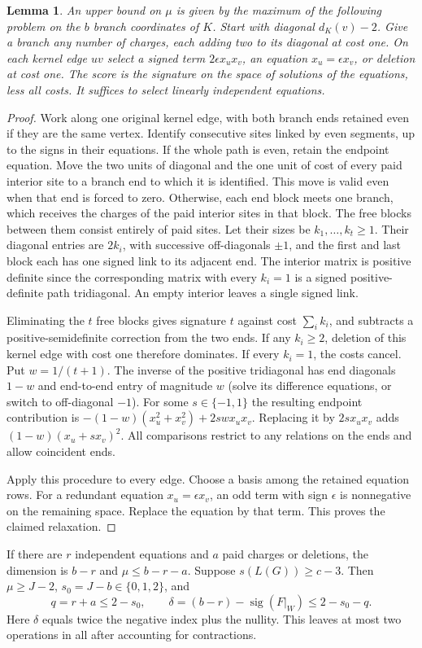 \documentclass[11pt]{article}
\newtheorem{lemma}[theorem]{Lemma}
\newcommand{\sig}{\operatorname{sig}}
\begin{document}
\begin{lemma}\label{lem:relax}
An upper bound on $\mu$ is given by the maximum of the following problem on the $b$ branch coordinates of $K$. Start with diagonal $d_K(v)-2$. Give a branch any number of charges, each adding two to its diagonal at cost one. On each kernel edge $uv$ select a signed term $2\epsilon x_u x_v$, an equation $x_u=\epsilon x_v$, or deletion at cost one. The score is the signature on the space of solutions of the equations, less all costs. It suffices to select linearly independent equations.
\end{lemma}
\begin{proof}
Work along one original kernel edge, with both branch ends retained even if they are the same vertex. Identify consecutive sites linked by even segments, up to the signs in their equations. If the whole path is even, retain the endpoint equation. Move the two units of diagonal and the one unit of cost of every paid interior site to a branch end to which it is identified. This move is valid even when that end is forced to zero. Otherwise, each end block meets one branch, which receives the charges of the paid interior sites in that block. The free blocks between them consist entirely of paid sites. Let their sizes be $k_1,\ldots,k_t\ge1$. Their diagonal entries are $2k_i$, with successive off-diagonals $\pm1$, and the first and last block each has one signed link to its adjacent end. The interior matrix is positive definite since the corresponding matrix with every $k_i=1$ is a signed positive-definite path tridiagonal. An empty interior leaves a single signed link.

Eliminating the $t$ free blocks gives signature $t$ against cost $\sum_i k_i$, and subtracts a positive-semidefinite correction from the two ends. If any $k_i\ge2$, deletion of this kernel edge with cost one therefore dominates. If every $k_i=1$, the costs cancel. Put $w=1/(t+1)$. The inverse of the positive tridiagonal has end diagonals $1-w$ and end-to-end entry of magnitude $w$ (solve its difference equations, or switch to off-diagonal $-1$). For some $s\in\{-1,1\}$ the resulting endpoint contribution is $-(1-w)(x_u^2+x_v^2)+2sw x_ux_v$. Replacing it by $2sx_ux_v$ adds $(1-w)(x_u+s x_v)^2$. All comparisons restrict to any relations on the ends and allow coincident ends.

Apply this procedure to every edge. Choose a basis among the retained equation rows. For a redundant equation $x_u=\epsilon x_v$, an odd term with sign $\epsilon$ is nonnegative on the remaining space. Replace the equation by that term. This proves the claimed relaxation.
\end{proof}
If there are $r$ independent equations and $a$ paid charges or deletions, the dimension is $b-r$ and $\mu\le b-r-a$. Suppose $s(L(G))\ge c-3$. Then $\mu\ge J-2$, $s_0=J-b\in\{0,1,2\}$, and
\[
 q=r+a\le2-s_0,\qquad
 \delta=(b-r)-\sig(F|_W)\le2-s_0-q.
\]
Here $\delta$ equals twice the negative index plus the nullity. This leaves at most two operations in all after accounting for contractions.
\end{document}
